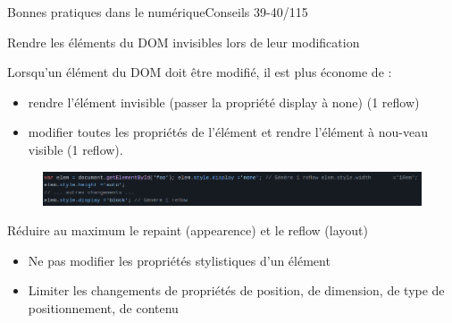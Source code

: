 \begin{frame}{Bonnes pratiques dans le numérique}{Conseils 39-40/115}
\begin{block}{Rendre les éléments du DOM invisibles lors de leur modification}

Lorsqu’un élément du DOM doit être modifié, il est plus économe de :
\begin{itemize}
    \item rendre l’élément invisible (passer la propriété display à none) (1 reﬂow)
    \item modifier toutes les propriétés de l’élément et rendre l’élément à nou-veau visible (1 reﬂow).
\end{itemize}
   \begin{figure}
    \includegraphics[scale=0.3]{chapitre2/wdd4/fig/c3.png}
\end{figure} 
\end{block}

\begin{block}{Réduire au maximum le repaint (appearence) et le reflow (layout)}

\begin{itemize}
    \item Ne pas modifier les propriétés stylistiques d’un élément
    \item Limiter les changements de propriétés de position, de dimension, de type de positionnement, de contenu
\end{itemize}

\end{block}


\end{frame}

